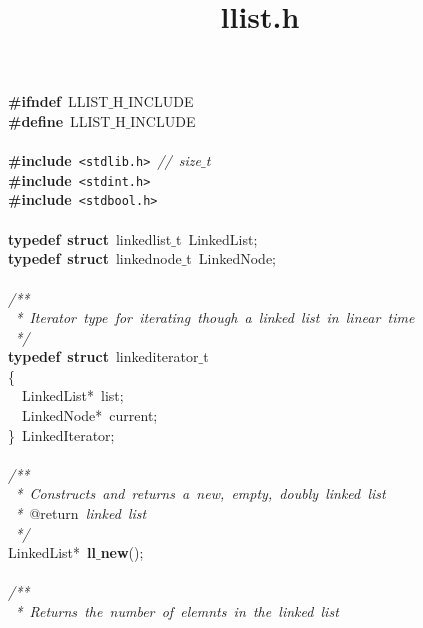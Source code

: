 \documentclass{article}
\title{llist.h}
\date{}
\begin{document}
\maketitle

\noindent
\mbox{}\textbf{\#ifndef}\ LLIST$\_$H$\_$INCLUDE \\
\mbox{}\textbf{\#define}\ LLIST$\_$H$\_$INCLUDE \\
\mbox{} \\
\mbox{}\textbf{\#include}\ \texttt{\textless{}stdlib.h\textgreater{}}\ \textit{//\ size$\_$t} \\
\mbox{}\textbf{\#include}\ \texttt{\textless{}stdint.h\textgreater{}} \\
\mbox{}\textbf{\#include}\ \texttt{\textless{}stdbool.h\textgreater{}} \\
\mbox{} \\
\mbox{}\textbf{typedef}\ \textbf{struct}\ linkedlist$\_$t\ LinkedList; \\
\mbox{}\textbf{typedef}\ \textbf{struct}\ linkednode$\_$t\ LinkedNode; \\
\mbox{} \\
\mbox{}\textit{/**} \\
\mbox{}\textit{\ *\ Iterator\ type\ for\ iterating\ though\ a\ linked\ list\ in\ linear\ time} \\
\mbox{}\textit{\ */} \\
\mbox{}\textbf{typedef}\ \textbf{struct}\ linkediterator$\_$t \\
\mbox{}\{ \\
\mbox{}\ \ LinkedList*\ list; \\
\mbox{}\ \ LinkedNode*\ current; \\
\mbox{}\}\ LinkedIterator; \\
\mbox{} \\
\mbox{}\textit{/**} \\
\mbox{}\textit{\ *\ Constructs\ and\ returns\ a\ new,\ empty,\ doubly\ linked\ list} \\
\mbox{}\textit{\ *\ }@return\textit{\ linked\ list} \\
\mbox{}\textit{\ */} \\
\mbox{}LinkedList*\ \textbf{ll$\_$new}(); \\
\mbox{} \\
\mbox{}\textit{/**} \\
\mbox{}\textit{\ *\ Returns\ the\ number\ of\ elemnts\ in\ the\ linked\ list} \\
\end{document}
